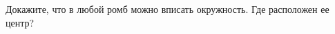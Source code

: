 \begin{ex}
	\begin{condition}
		Докажите, что в любой ромб можно вписать окружность. Где расположен ее центр?
	\end{condition}
\end{ex}